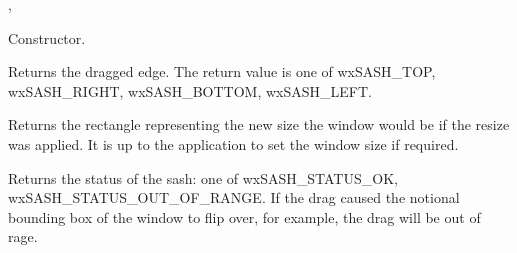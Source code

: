 
,\rtfsp
{}


\label{wxsasheventctor}


Constructor.

\label{wxsasheventgetedge}


Returns the dragged edge. The return value is one of wxSASH\_TOP, wxSASH\_RIGHT, wxSASH\_BOTTOM, wxSASH\_LEFT.

\label{wxsasheventgetdragrect}


Returns the rectangle representing the new size the window would be if the resize was applied. It is
up to the application to set the window size if required.

\label{wxsasheventgetdragstatus}


Returns the status of the sash: one of wxSASH\_STATUS\_OK, wxSASH\_STATUS\_OUT\_OF\_RANGE.
If the drag caused the notional bounding box of the window to flip over, for example, the drag will be out of rage.


